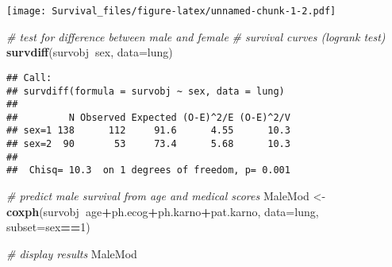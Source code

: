 \documentclass[]{article}
\newenvironment{Shaded}{\begin{snugshade}}{\end{snugshade}}
\newcommand{\KeywordTok}[1]{\textcolor[rgb]{0.13,0.29,0.53}{\textbf{#1}}}
\newcommand{\DataTypeTok}[1]{\textcolor[rgb]{0.13,0.29,0.53}{#1}}
\newcommand{\DecValTok}[1]{\textcolor[rgb]{0.00,0.00,0.81}{#1}}
\newcommand{\StringTok}[1]{\textcolor[rgb]{0.31,0.60,0.02}{#1}}
\newcommand{\CommentTok}[1]{\textcolor[rgb]{0.56,0.35,0.01}{\textit{#1}}}
\newcommand{\OperatorTok}[1]{\textcolor[rgb]{0.81,0.36,0.00}{\textbf{#1}}}
\newcommand{\NormalTok}[1]{#1}
\begin{document}
\begin{Shaded}
\end{Shaded}

\texttt{[image: Survival\_files/figure-latex/unnamed-chunk-1-2.pdf]}

\begin{Shaded}
\begin{Highlighting}[]
\CommentTok{# test for difference between male and female}
\CommentTok{# survival curves (logrank test)}
\KeywordTok{survdiff}\NormalTok{(survobj}\OperatorTok{~}\NormalTok{sex, }\DataTypeTok{data=}\NormalTok{lung)}
\end{Highlighting}
\end{Shaded}

\begin{verbatim}
## Call:
## survdiff(formula = survobj ~ sex, data = lung)
## 
##         N Observed Expected (O-E)^2/E (O-E)^2/V
## sex=1 138      112     91.6      4.55      10.3
## sex=2  90       53     73.4      5.68      10.3
## 
##  Chisq= 10.3  on 1 degrees of freedom, p= 0.001
\end{verbatim}

\begin{Shaded}
\begin{Highlighting}[]
\CommentTok{# predict male survival from age and medical scores}
\NormalTok{MaleMod <-}\StringTok{ }\KeywordTok{coxph}\NormalTok{(survobj}\OperatorTok{~}\NormalTok{age}\OperatorTok{+}\NormalTok{ph.ecog}\OperatorTok{+}\NormalTok{ph.karno}\OperatorTok{+}\NormalTok{pat.karno,}
                 \DataTypeTok{data=}\NormalTok{lung, }\DataTypeTok{subset=}\NormalTok{sex}\OperatorTok{==}\DecValTok{1}\NormalTok{)}

\CommentTok{# display results}
\NormalTok{MaleMod}
\end{Highlighting}
\end{Shaded}
\end{document}
